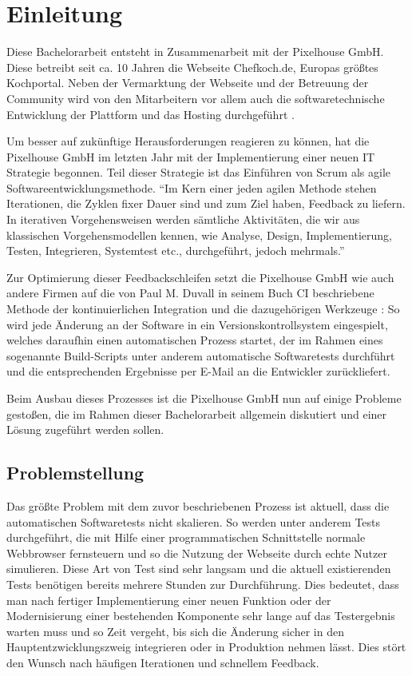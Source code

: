 \section{Einleitung}

Diese Bachelorarbeit entsteht in Zusammenarbeit mit der Pixelhouse GmbH. Diese betreibt seit ca. 10 Jahren die Webseite Chefkoch.de, Europas größtes Kochportal. Neben der Vermarktung der Webseite und der Betreuung der Community wird von den Mitarbeitern vor allem auch die softwaretechnische Entwicklung der Plattform und das Hosting durchgeführt \citep[Vgl.][]{pixelhouse14}.

Um besser auf zukünftige Herausforderungen reagieren zu können, hat die Pixelhouse GmbH im letzten Jahr mit der Implementierung einer neuen IT Strategie begonnen. Teil dieser Strategie ist das Einführen von Scrum als agile Softwareentwicklungsmethode. "`Im Kern einer jeden agilen Methode stehen Iterationen, die Zyklen fixer Dauer sind und zum Ziel haben, Feedback zu liefern. In iterativen Vorgehensweisen werden sämtliche Aktivitäten, die wir aus klassischen Vorgehensmodellen kennen, wie Analyse, Design, Implementierung, Testen, Integrieren, Systemtest etc., durchgeführt, jedoch mehrmals."' \citep[S.][S. 18]{wintersteiger13}

Zur Optimierung dieser Feedbackschleifen setzt die Pixelhouse GmbH wie auch andere Firmen auf die von Paul M. Duvall in seinem Buch \ac{CI} beschriebene Methode der kontinuierlichen Integration und die dazugehörigen Werkzeuge \citep[Vgl.][S. 12]{DuvMatAnd07}: So wird jede Änderung an der Software in ein Versionskontrollsystem eingespielt, welches daraufhin einen automatischen Prozess startet, der im Rahmen eines sogenannte Build-Scripts unter anderem automatische Softwaretests durchführt und die entsprechenden Ergebnisse per E-Mail an die Entwickler zurückliefert.

Beim Ausbau dieses Prozesses ist die Pixelhouse GmbH nun auf einige Probleme gestoßen, die im Rahmen dieser Bachelorarbeit allgemein diskutiert und einer Lösung zugeführt werden sollen.

\subsection{Problemstellung}

Das größte Problem mit dem zuvor beschriebenen Prozess ist aktuell, dass die automatischen Softwaretests nicht skalieren. So werden unter anderem Tests durchgeführt, die mit Hilfe einer programmatischen Schnittstelle normale Webbrowser fernsteuern und so die Nutzung der Webseite durch echte Nutzer simulieren. Diese Art von Test sind sehr langsam und die aktuell existierenden Tests benötigen bereits mehrere Stunden zur Durchführung. Dies bedeutet, dass man nach fertiger Implementierung einer neuen Funktion oder der Modernisierung einer bestehenden Komponente sehr lange auf das Testergebnis warten muss und so Zeit vergeht, bis sich die Änderung sicher in den Hauptentzwicklungszweig integrieren oder in Produktion nehmen lässt. Dies stört den Wunsch nach häufigen Iterationen und schnellem Feedback.

